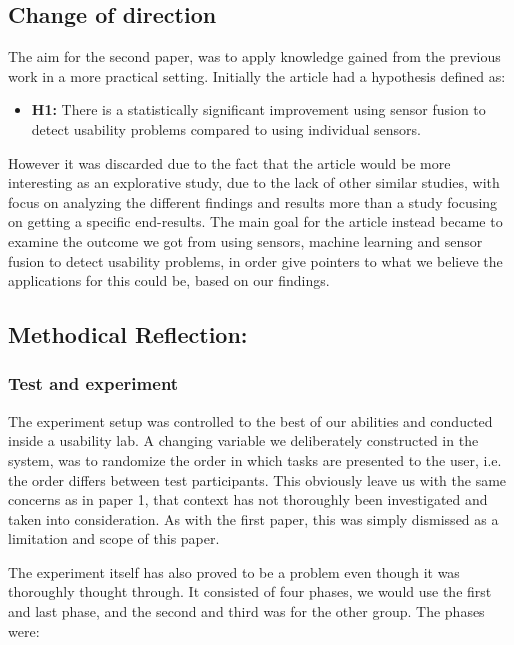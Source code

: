 \subsection{Change of direction}
The aim for the second paper, was to apply knowledge gained from the previous work in a more practical setting. 
Initially the article had a hypothesis defined as:
\begin{itemize}
    \item \textbf{H1:} There is a statistically significant improvement using sensor fusion to detect usability problems compared to using individual sensors.
\end{itemize}
However it was discarded due to the fact that the article would be more interesting as an explorative study, due to the lack of other similar studies, with focus on analyzing the different findings and results more than a study focusing on getting a specific end-results.
The main goal for the article instead became to examine the outcome we got from using sensors, machine learning and sensor fusion to detect usability problems,
in order give pointers to what we believe the applications for this could be, based on our findings.

\subsection{Methodical Reflection:}
\subsubsection{Test and experiment}
The experiment setup was controlled to the best of our abilities and conducted inside a usability lab. A changing
variable we deliberately constructed in the system, was to randomize the order in which tasks are presented to the user,
i.e. the order differs between test participants.
This obviously leave us with the same concerns as in paper 1, that context has not thoroughly been investigated and taken
into consideration. As with the first paper, this was simply dismissed as a limitation and scope of this paper.

The experiment itself has also proved to be a problem even though it was thoroughly thought through.
It consisted of four phases, we would use the first and last phase, and the second and third was for the other group. The phases were:


